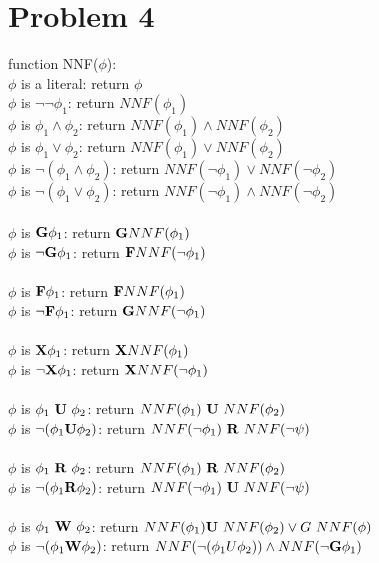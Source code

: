 \documentclass[11pt,leqno,fleqn]{article}
\newcommand{\tab}{\hspace*{2em}}
\begin{document}
\section{Problem 4}

function NNF($\phi$):\\
\tab $\phi$ is a literal: return $\phi$ \\
\tab $\phi$ is $\neg \neg \phi_1$: return $NNF(\phi_1)$\\
\tab $\phi$ is $\phi_1 \land \phi_2$: return $NNF(\phi_1) \land NNF(\phi_2)$ \\
\tab $\phi$ is $\phi_1 \lor \phi_2$: return $NNF(\phi_1) \lor NNF(\phi_2)$ \\
\tab $\phi$ is $\neg(\phi_1 \land \phi_2)$: return $NNF(\neg \phi_1) \lor NNF(\neg \phi_2)$ \\
\tab $\phi$ is $\neg(\phi_1 \lor \phi_2)$: return $NNF(\neg \phi_1) \land NNF(\neg \phi_2)$ \\
\\
\tab $\phi$ is $\bold{G}\phi_1$: return $\bold{G} NNF( \phi_1) $\\
\tab $\phi$ is $\neg \bold{G}\phi_1$: return $\bold{F} NNF(\neg \phi_1)$\\
\\
\tab $\phi$ is $\bold{F}\phi_1$: return $\bold{F} NNF( \phi_1 )$\\
\tab $\phi$ is $\neg \bold{F}\phi_1$: return $\bold{G} NNF(\neg \phi_1)$\\
\\
\tab $\phi$ is $\bold{X}\phi_1$: return $\bold{X} NNF( \phi_1) $\\
\tab $\phi$ is $\neg \bold{X}\phi_1$: return $\bold{X} NNF(\neg \phi_1)$\\
\\
\tab $\phi$ is  $\phi_1\ \bold{U}\  \phi_2$: return $NNF(\phi_1)\ \bold{U} \ NNF(\phi_2)$\\
\tab $\phi$ is $\neg(\phi_1 \bold{U} \phi_2)$: return $NNF(\neg \phi_1)\ \bold{R} \ NNF(\neg \psi)$\\
\\
\tab $\phi$ is  $\phi_1 \ \bold{R} \ \phi_2$: return $NNF(\phi_1)\ \bold{R} \ NNF(\phi_2)$\\
\tab $\phi$ is $\neg(\phi_1 \bold{R} \phi_2)$: return $NNF(\neg \phi_1)\ \bold{U} \ NNF(\neg \psi)$\\
\\
\tab $\phi$ is  $\phi_1 \ \bold{W} \ \phi_2$: return $NNF(\phi_1) \bold{U} \ NNF(\phi_2 ) \lor G \ NNF(\phi)$ \\
\tab $\phi$ is $\neg(\phi_1 \bold{W} \phi_2)$: return $NNF(\neg(\phi_1 U \phi_2)) \land NNF(\neg \bold{G}\phi_1)$  \\
\end{document}
